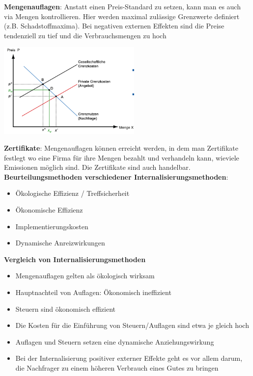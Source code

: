 \documentclass[9pt, landscape, fleqn]{scrartcl}
\begin{document}
\begin{multicols*}{3}
\textbf{Mengenauflagen}: Anstatt einen Preis-Standard zu setzen, kann man es auch via Mengen kontrollieren. Hier werden maximal zulässige Grenzwerte definiert (z.B. Schadstoffmaxima). Bei negativen externen Effekten sind die Preise tendenziell zu tief und die Verbrauchsmengen zu hoch

\begin{center}
    \includegraphics[width=7cm]{Mengenregulierung.png}
\end{center}

\textbf{Zertifikate}: Mengenauflagen können erreicht werden, in dem man Zertifikate festlegt wo eine Firma für ihre Mengen bezahlt und verhandeln kann, wieviele Emissionen möglich sind. Die Zertifikate sind auch handelbar. \\

\textbf{Beurteilungsmethoden verschiedener Internalisierungsmethoden}:

\begin{itemize}
    \item Ökologische Effizienz / Treffsicherheit
    \item Ökonomische Effizienz
    \item Implementierungskosten 
    \item Dynamische Anreizwirkungen
\end{itemize}

\textbf{Vergleich von Internalisierungsmethoden}

\begin{itemize}
    \item Mengenauflagen gelten als ökologisch wirksam
    \item Hauptnachteil von Auflagen: Ökonomisch ineffizient
    \item Steuern sind ökonomisch effizient
    \item Die Kosten für die Einführung von Steuern/Auflagen sind etwa je gleich hoch 
    \item Auflagen und Steuern setzen eine dynamische Anziehungswirkung
    \item Bei der Internalisierung positiver externer Effekte geht es vor allem darum, die Nachfrager zu einem höheren Verbrauch eines Gutes zu bringen
\end{itemize}


\end{multicols*}
\end{document}
